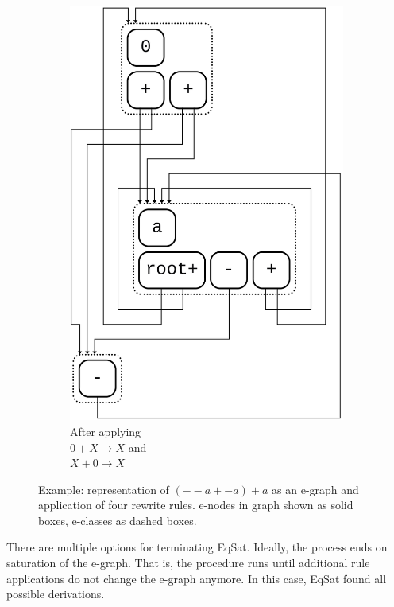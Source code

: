 \begin{figure}[h]
\begin{subfigure}[t]{0.23\textwidth}
		\includegraphics[width=1.4\linewidth,height=1.4\linewidth,keepaspectratio=true]{img/e_graph4.png}
		\caption{\scriptsize After applying\\$0 + X \to X$ and\\$X + 0 \to X$}
		\label{fig:e-graph-sub4}
	\end{subfigure}
	\caption{Example: representation of $(--a + -a) + a$ as an e-graph and application of four rewrite rules. e-nodes in graph shown as solid boxes, e-classes as dashed boxes.}
	\label{fig:e-graph-example}
\end{figure}

There are multiple options for terminating EqSat. Ideally, the process ends on saturation of the e-graph. That is, the procedure runs until additional rule applications do not change the e-graph anymore. In this case, EqSat found all possible derivations. 

